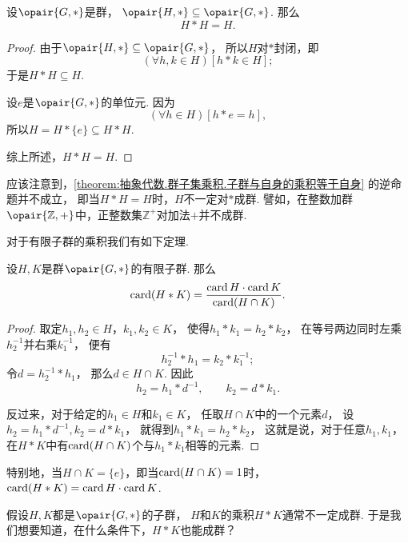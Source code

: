 \begin{proposition}\label{theorem:抽象代数.群子集乘积.子群与自身的乘积等于自身}
设\(\opair{G,*}\)是群，
\(\opair{H,*} \subseteq \opair{G,*}\).
那么\[
	H * H = H.
\]
\begin{proof}
由于\(\opair{H,*}\subseteq\opair{G,*}\)，
所以\(H\)对\(*\)封闭，即\[
	(\forall h,k \in H)
	[h * k \in H];
\]
于是\(H * H \subseteq H\).

设\(e\)是\(\opair{G,*}\)的单位元.
因为\[
	(\forall h \in H)
	[h * e = h],
\]
所以\(H = H * \{e\} \subseteq H * H\).

综上所述，\(H * H = H\).
\end{proof}
\end{proposition}

应该注意到，\cref{theorem:抽象代数.群子集乘积.子群与自身的乘积等于自身} 的逆命题并不成立，
即当\(H * H = H\)时，\(H\)不一定对\(*\)成群.
譬如，在整数加群\(\opair{\mathbb{Z},+}\)中，正整数集\(\mathbb{Z}^+\)对加法\(+\)并不成群.

对于有限子群的乘积我们有如下定理.
\begin{theorem}
设\(H,K\)是群\(\opair{G,*}\)的有限子群.
那么\[
	\operatorname{card}(H * K)
	= \frac{\operatorname{card} H \cdot \operatorname{card} K}{\operatorname{card}(H \cap K)}.
\]
\begin{proof}
取定\(h_1,h_2 \in H\)，\(k_1,k_2 \in K\)，
使得\(h_1 * k_1 = h_2 * k_2\)，
在等号两边同时左乘\(h_2^{-1}\)并右乘\(k_1^{-1}\)，
便有\[
	h_2^{-1} * h_1 = k_2 * k_1^{-1};
\]
令\(d = h_2^{-1} * h_1\)，
那么\(d \in H \cap K\).
因此\[
	h_2 = h_1 * d^{-1}, \qquad
	k_2 = d * k_1.
\]

反过来，对于给定的\(h_1 \in H\)和\(k_1 \in K\)，
任取\(H \cap K\)中的一个元素\(d\)，
设\(h_2 = h_1 * d^{-1},
k_2 = d * k_1\)，
就得到\(h_1 * k_1 = h_2 * k_2\)，
这就是说，对于任意\(h_1,k_1\)，
在\(H * K\)中有\(\operatorname{card}(H \cap K)\)个与\(h_1 * k_1\)相等的元素.
\end{proof}
\end{theorem}

特别地，当\(H \cap K = \{e\}\)，即当\(\operatorname{card}(H \cap K) = 1\)时，
\(\operatorname{card}(H * K) = \operatorname{card} H \cdot \operatorname{card} K\).

假设\(H,K\)都是\(\opair{G,*}\)的子群，
\(H\)和\(K\)的乘积\(H * K\)通常不一定成群.
于是我们想要知道，在什么条件下，\(H * K\)也能成群？

